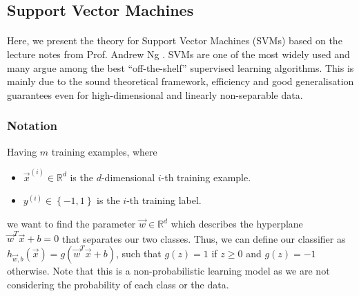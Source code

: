 \subsection{Support Vector Machines}

\paragraph{}
	Here, we present the theory for Support Vector Machines (SVMs) based on the lecture notes from Prof. Andrew Ng \cite{ng13}. SVMs are one of the most widely used and many argue among the best ``off-the-shelf'' supervised learning algorithms. This is mainly due to the sound theoretical framework, efficiency and good generalisation guarantees even for high-dimensional and linearly non-separable data.
	
\subsubsection{Notation}
	Having $m$ training examples, where
	\begin{itemize}

  		\item $\vec{x}^{(i)} \in \mathbb{R}^d$ is the $d$-dimensional $i$-th training example.
  		\item $y^{(i)} \in \left\{-1, 1 \right\}$ is the $i$-th training label.

	\end{itemize}
we want to find the parameter $\vec{w} \in \mathbb{R}^d$ which describes the hyperplane $\vec{w}^T \vec{x} + b = 0$ that separates our two classes. Thus, we can define our classifier as $h_{\vec{w}, b}(\vec{x}) = g\left(\vec{w}^T \vec{x} + b \right)$, such that $g(z) = 1$ if $z \geq 0$ and $g(z) = -1$ otherwise. Note that this is a non-probabilistic learning model as we are not considering the probability of each class or the data.
	
